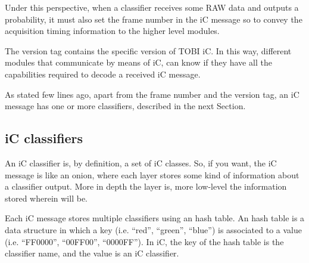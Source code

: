 \documentclass[a4paper,10pt]{article}
\begin{document}
Under this perspective, when a classifier receives some RAW data and outputs
a probability, it must also set the frame number in the iC message so to convey
the acquisition timing information to the higher level modules.

The version tag contains the specific version of TOBI iC. In this way, different
modules that communicate by means of iC, can know if they have all the
capabilities required to decode a received iC message.

As stated few lines ago, apart from the frame number and the version tag, an iC
message has one or more classifiers, described in the next Section.

\subsection{iC classifiers}
\label{sec:icclassifier}
An iC classifier is, by definition, a set of iC classes. So, if you want, the iC
message is like an onion, where each layer stores some kind of information about
a classifier output. More in depth the layer is, more low-level the information
stored wherein will be.

Each iC message stores multiple classifiers using an hash table. An hash table
is a data structure in which a key (i.e. ``red'', ``green'', ``blue'') is
associated to a value (i.e. ``FF0000'', ``00FF00'', ``0000FF'').
In iC, the key of the hash table is the classifier name, and the value is an iC
classifier.
\end{document}
